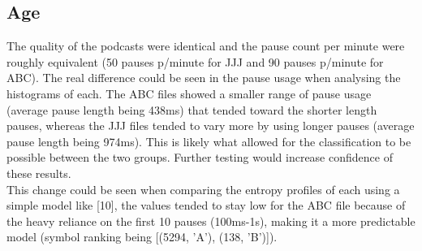 %


\subsection{Age}
The quality of the podcasts were identical and the pause count per minute were roughly equivalent (50 pauses p/minute for JJJ and 90 pauses p/minute for ABC). The real difference could be seen in the pause usage when analysing the histograms of each. The ABC files showed a smaller range of pause usage (average pause length being 438ms) that tended toward the shorter length pauses, whereas the JJJ files tended to vary more by using longer pauses (average pause length being 974ms). This is likely what allowed for the classification to be possible between the two groups. Further testing would increase confidence of these results. \\

This change could be seen when comparing the entropy profiles of each using a simple model like [10], the values tended to stay low for the ABC file because of the heavy reliance on the first 10 pauses (100ms-1s), making it a more predictable model (symbol ranking being [(5294, 'A'), (138, 'B')]). \\

